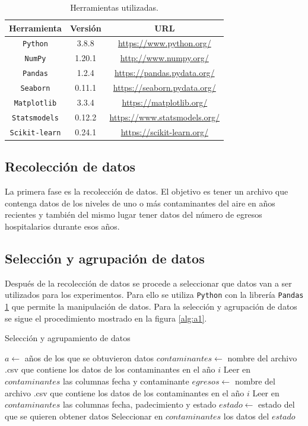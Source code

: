 \begin{table}[H]
	{\centering
		\caption{Herramientas utilizadas.}
		\begin{tabular}{|c|c|c|}
			\hline 
			Herramienta & Versión & URL\\
			\hline
			\texttt{Python} & 3.8.8 & \url{https://www.python.org/}\\
			\hline
			\texttt{NumPy} & 1.20.1 & \url{http://www.numpy.org/}\\
			\hline
			\texttt{Pandas} & 1.2.4 & \url{https://pandas.pydata.org/}\\
			\hline
			\texttt{Seaborn} & 0.11.1 & \url{https://seaborn.pydata.org/}\\
			\hline
			\texttt{Matplotlib} & 3.3.4 & \url{https://matplotlib.org/}\\
			\hline
			\texttt{Statsmodels} & 0.12.2 & \url{https://www.statsmodels.org/}\\
			\hline
			\texttt{Scikit-learn} & 0.24.1 & \url{https://scikit-learn.org/}\\
			\hline
		\end{tabular}
		
	\label{tab:Herramientas utilizadas}
	}
\end{table}

\subsection{Recolección de datos}
La primera fase es la recolección de datos. El objetivo es tener un archivo que contenga datos de los niveles de uno o más contaminantes del aire en años recientes y también del mismo lugar tener datos del número de egresos hospitalarios durante esos años.

\subsection{Selección y agrupación de datos}
Después de la recolección de datos se procede a seleccionar que datos van a ser utilizados para los experimentos. Para ello se utiliza \texttt{Python} con la librería \texttt{Pandas} \ref{tab:Herramientas utilizadas} que permite la manipulación de datos. 
Para la selección y agrupación de datos se sigue el procedimiento mostrado en la figura \ref{alg:a1}.

\begin{algorithm}
\caption{Selección y agrupamiento de datos}\label{alg:a1}
\begin{algorithmic}[1]
\State $a \leftarrow $ años de los que se obtuvieron datos
    \State $contaminantes \leftarrow $ nombre del archivo .csv que contiene los datos de los contaminantes en el año $i$
    \State Leer en $contaminantes$ las columnas fecha y contaminante 
    \State $egresos \leftarrow $ nombre del archivo .csv que contiene los datos de los contaminantes en el año $i$
    \State Leer en $contaminantes$ las columnas fecha, padecimiento y estado
    \State $estado \leftarrow $ estado del que se quieren obtener datos
    \State Seleccionar en $contaminantes$ los datos del $estado$
\EndFor
\end{algorithmic} 
\end{algorithm}

